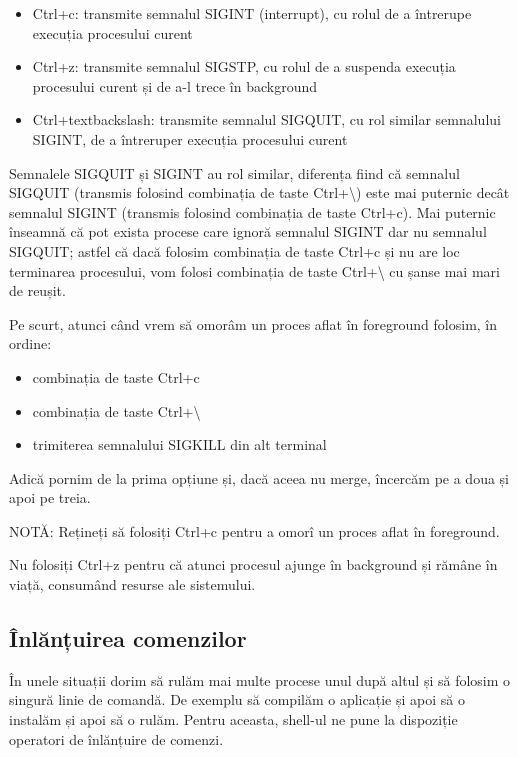 \begin{itemize}
	\item Ctrl+c: transmite semnalul SIGINT (interrupt), cu rolul de a
		întrerupe execuția procesului curent
	\item Ctrl+z: transmite semnalul SIGSTP, cu rolul de a suspenda execuția
		procesului curent și de a-l trece în background
	\item Ctrl+textbackslash{}: transmite semnalul SIGQUIT, cu rol similar semnalului
		SIGINT, de a întreruper execuția procesului curent
\end{itemize}

Semnalele SIGQUIT și SIGINT au rol similar, diferența fiind că semnalul SIGQUIT
(transmis folosind combinația de taste Ctrl+\textbackslash{}) este mai puternic
decât semnalul SIGINT (transmis folosind combinația de taste Ctrl+c). Mai
puternic înseamnă că pot exista procese care ignoră semnalul SIGINT dar nu
semnalul SIGQUIT; astfel că dacă folosim combinația de taste Ctrl+c și nu are
loc terminarea procesului, vom folosi combinația de taste Ctrl+\textbackslash{} cu șanse mai
mari de reușit.

Pe scurt, atunci când vrem să omorâm un proces aflat în foreground folosim, în
ordine:

\begin{itemize}
	\item combinația de taste Ctrl+c
	\item combinația de taste Ctrl+\textbackslash{}
	\item trimiterea semnalului SIGKILL din alt terminal
\end{itemize}

Adică pornim de la prima opțiune și, dacă aceea nu merge, încercăm pe a doua și
apoi pe treia.

NOTĂ: Rețineți să folosiți Ctrl+c pentru a omorî un proces aflat în foreground.

Nu folosiți Ctrl+z pentru că atunci procesul ajunge în background și rămâne în
viață, consumând resurse ale sistemului.

\subsection{Înlănțuirea comenzilor}
\label{sec:procese-operatii-inlantuire}

În unele situații dorim să rulăm mai multe procese unul după altul și să folosim
o singură linie de comandă. De exemplu să compilăm o aplicație și apoi să o
instalăm și apoi să o rulăm. Pentru aceasta, shell-ul ne pune la dispoziție
operatori de înlănțuire de comenzi.

